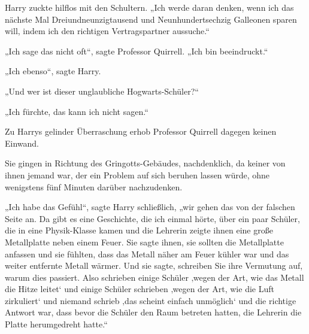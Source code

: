 Harry zuckte hilflos mit den Schultern. „Ich werde daran denken, wenn ich das nächste Mal Dreiundneunzigtausend und Neunhundertsechzig Galleonen sparen will, indem ich den richtigen Vertragspartner aussuche.“

„Ich sage das nicht oft“, sagte Professor Quirrell. „Ich bin beeindruckt.“

„Ich ebenso“, sagte Harry.

„Und wer ist dieser unglaubliche Hogwarts-Schüler?“

„Ich fürchte, das kann ich nicht sagen.“

Zu Harrys gelinder Überraschung erhob Professor Quirrell dagegen keinen Einwand.

Sie gingen in Richtung des Gringotts-Gebäudes, nachdenklich, da keiner von ihnen jemand war, der ein Problem auf sich beruhen lassen würde, ohne wenigstens fünf Minuten darüber nachzudenken.

„Ich habe das Gefühl“, sagte Harry schließlich, „wir gehen das von der falschen Seite an. Da gibt es eine Geschichte, die ich einmal hörte, über ein paar Schüler, die in eine Physik-Klasse kamen und die Lehrerin zeigte ihnen eine große Metallplatte neben einem Feuer. Sie sagte ihnen, sie sollten die Metallplatte anfassen und sie fühlten, dass das Metall näher am Feuer kühler war und das weiter entfernte Metall wärmer. Und sie sagte, schreiben Sie ihre Vermutung auf, warum dies passiert. Also schrieben einige Schüler ‚wegen der Art, wie das Metall die Hitze leitet‘ und einige Schüler schrieben ‚wegen der Art, wie die Luft zirkuliert‘ und niemand schrieb ‚das scheint einfach unmöglich‘ und die richtige Antwort war, dass bevor die Schüler den Raum betreten hatten, die Lehrerin die Platte herumgedreht hatte.“

